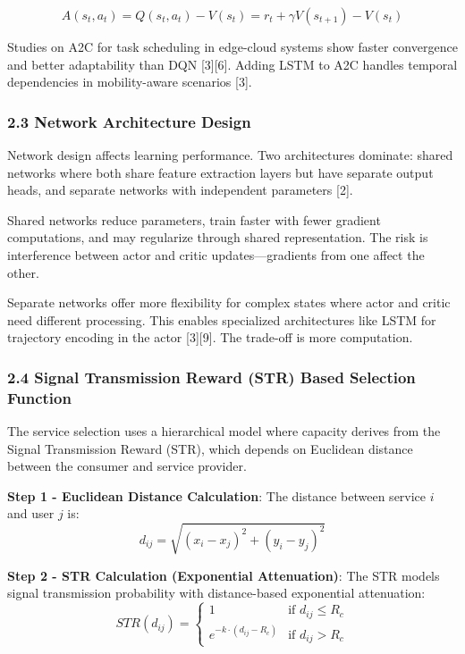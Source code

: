 \[A(s_t, a_t) = Q(s_t, a_t) - V(s_t) = r_t + \gamma V(s_{t+1}) - V(s_t)\]

Studies on A2C for task scheduling in edge-cloud systems show faster
convergence and better adaptability than DQN {[}3{]}{[}6{]}. Adding LSTM
to A2C handles temporal dependencies in mobility-aware scenarios
{[}3{]}.

\hypertarget{network-architecture-design}{%
	\subsubsection{2.3 Network Architecture
		Design}\label{network-architecture-design}}

Network design affects learning performance. Two architectures dominate:
shared networks where both share feature extraction layers but have
separate output heads, and separate networks with independent parameters
{[}2{]}.

Shared networks reduce parameters, train faster with fewer gradient
computations, and may regularize through shared representation. The risk
is interference between actor and critic updates---gradients from one
affect the other.

Separate networks offer more flexibility for complex states where actor
and critic need different processing. This enables specialized
architectures like LSTM for trajectory encoding in the actor
{[}3{]}{[}9{]}. The trade-off is more computation.

\hypertarget{signal-transmission-reward-str-based-selection-function}{%
	\subsubsection{2.4 Signal Transmission Reward (STR) Based Selection
		Function}\label{signal-transmission-reward-str-based-selection-function}}

The service selection uses a hierarchical model where capacity derives
from the Signal Transmission Reward (STR), which depends on Euclidean
distance between the consumer and service provider.

\textbf{Step 1 - Euclidean Distance Calculation}: The distance between
service \(i\) and user \(j\) is:
\[d_{ij} = \sqrt{(x_i - x_j)^2 + (y_i - y_j)^2}\]

\textbf{Step 2 - STR Calculation (Exponential Attenuation)}: The STR
models signal transmission probability with distance-based exponential
attenuation:
\[STR(d_{ij}) = \begin{cases} 1 & \text{if } d_{ij} \leq R_c \\ e^{-k \cdot (d_{ij} - R_c)} & \text{if } d_{ij} > R_c \end{cases}\]

